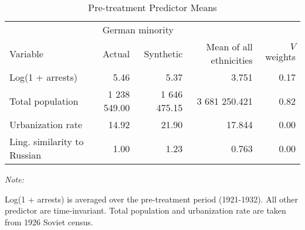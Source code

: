 \begin{table}[!h]

\caption{\label{tab:sc_predictor_means_robustness}Pre-treatment Predictor Means}
\centering
\begin{threeparttable}
\fontsize{10}{12}\selectfont
\begin{tabular}{lrrrr}
\toprule
\multicolumn{1}{c}{ } & \multicolumn{2}{c}{German minority} \\
\cmidrule(l{2pt}r{2pt}){2-3}
Variable & Actual & Synthetic & Mean of all ethnicities & $V$ weights\\
\midrule
Log(1 + arrests) & 5.46 & 5.37 & 3.751 & 0.17\\
Total population & 1 238 549.00 & 1 646 475.15 & 3 681 250.421 & 0.82\\
Urbanization rate & 14.92 & 21.90 & 17.844 & 0.00\\
Ling. similarity to Russian & 1.00 & 1.23 & 0.763 & 0.00\\
\bottomrule
\end{tabular}
\begin{tablenotes}
\item \textit{Note: } 
\item Log(1 + arrests) is averaged over the pre-treatment period (1921-1932). All other predictor are time-invariant. Total population and urbanization rate are taken from 1926 Soviet census.
\end{tablenotes}
\end{threeparttable}
\end{table}